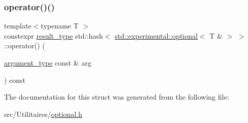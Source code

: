 \subsubsection{\texorpdfstring{operator()()}{operator()()}}
{\footnotesize\ttfamily template$<$typename T $>$ \\
constexpr \mbox{\hyperlink{structstd_1_1hash_3_01std_1_1experimental_1_1optional_3_01_t_01_6_01_4_01_4_acfb996ccc0604598b856ff0b73abf1a0}{result\+\_\+type}} std\+::hash$<$ \mbox{\hyperlink{classstd_1_1experimental_1_1optional}{std\+::experimental\+::optional}}$<$ T \& $>$ $>$\+::operator() (\begin{DoxyParamCaption}\item[{\mbox{\hyperlink{structstd_1_1hash_3_01std_1_1experimental_1_1optional_3_01_t_01_6_01_4_01_4_ab5e4cdb491b0c3833fa266cdf95a26f8}{argument\+\_\+type}} const \&}]{arg }\end{DoxyParamCaption}) const\hspace{0.3cm}{\ttfamily [inline]}}



The documentation for this struct was generated from the following file\+:\begin{DoxyCompactItemize}
\item 
src/\+Utilitaires/\mbox{\hyperlink{optional_8h}{optional.\+h}}\end{DoxyCompactItemize}
